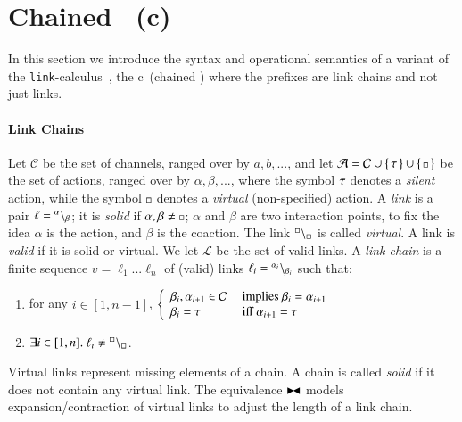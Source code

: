 
\section{Chained \CNA \ (c\CNA)}
\label{sec:ccna}

In this section we introduce  the syntax and operational semantics
of a variant of the {\tt link}-calculus~\cite{BodeiBB12}, the c\CNA\  (chained \CNA)
where the prefixes are link chains and not just links.

\paragraph{Link Chains}
Let $\mathcal{C}$ be the set of channels, ranged over by $a,b,...$, and 
let $\mathcal{A} = \mathcal{C} \cup \{\, \tau \,\} \cup \{\, {\scriptstyle \square} \,\}$ be the set of actions, ranged over by $\alpha,\beta,...$,
where the symbol $\tau$ denotes a \emph{silent} action, while the symbol $\scriptstyle {\square}$ denotes a \emph{virtual} (non-specified) action.
A \emph{link} is a pair $\ell={}^{\alpha} \backslash_{\beta}$;
it is \emph{solid} if $\alpha,\beta \neq \ \noacts$; 
{\color{red} $\alpha$ and $\beta$ are two interaction points, to fix the idea $\alpha$ is the action, and $\beta$ is the coaction.}
The link ${}^{\scriptstyle {\square}} \backslash_{\scriptstyle {\square}}$ is called \emph{virtual}.
A link is \emph{valid} if it is solid or virtual.
We let $\mathcal{L}$ be the set of valid links.
%
A \emph{link chain} is a 
finite sequence $v = \ell_{1}...\ell_{n}$ of (valid) links  $\ell_{i} = {}^{\alpha_{i}} \backslash_{\beta_{i}}$ such that:
\begin{enumerate}
\item for any $i\in [1,n-1]$, 
$\left\{\begin{array}{ll}
\beta_{i},\alpha_{i+1}\in \mathcal{C} & \mbox{ implies } \beta_{i} = \alpha_{i+1}\\
\beta_{i}=\tau & \mbox{ iff } \alpha_{i+1}=\tau
\end{array}\right.
$
\item  $\exists i \in [1,n]. \ \ell_i \neq {}^{\scriptstyle {\square}} \backslash_{\scriptstyle {\square}}$.
\end{enumerate}

Virtual links represent missing elements of a chain. 
A chain is called \emph{solid} if it does not contain any virtual link.
The equivalence $\blackstretcheq$ models expansion/contraction of virtual links to adjust the length of a link chain.


